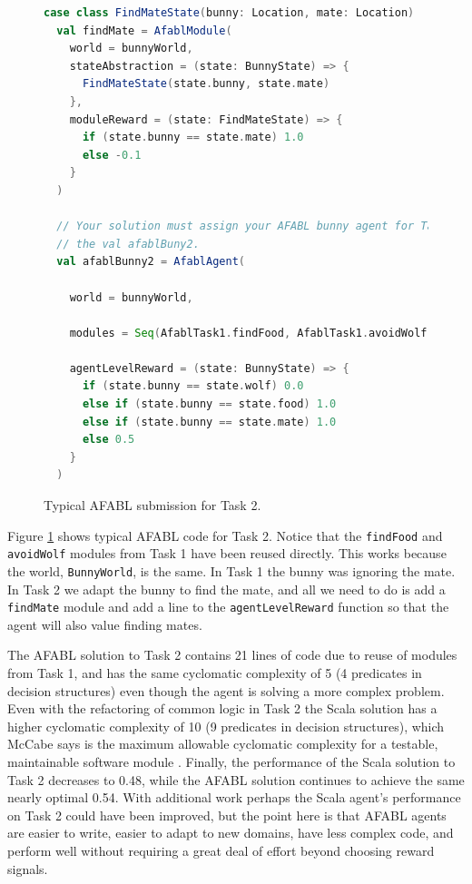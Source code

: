 \begin{figure}[!h]
\begin{center}

\begin{lstlisting}[language=Scala]
  case class FindMateState(bunny: Location, mate: Location)
  val findMate = AfablModule(
    world = bunnyWorld,
    stateAbstraction = (state: BunnyState) => {
      FindMateState(state.bunny, state.mate)
    },
    moduleReward = (state: FindMateState) => {
      if (state.bunny == state.mate) 1.0
      else -0.1
    }
  )

  // Your solution must assign your AFABL bunny agent for Task 2 to
  // the val afablBuny2.
  val afablBunny2 = AfablAgent(

    world = bunnyWorld,

    modules = Seq(AfablTask1.findFood, AfablTask1.avoidWolf, findMate),

    agentLevelReward = (state: BunnyState) => {
      if (state.bunny == state.wolf) 0.0
      else if (state.bunny == state.food) 1.0
      else if (state.bunny == state.mate) 1.0
      else 0.5
    }
  )
\end{lstlisting}

\caption{Typical AFABL submission for Task 2.}
\end{center}
\label{fig:afabl-task2-submission}
\end{figure}

Figure \ref{fig:afabl-task2-submission} shows typical AFABL code for Task 2. Notice that the {\tt findFood} and {\tt avoidWolf} modules from Task 1 have been reused directly. This works because the world, {\tt BunnyWorld}, is the same. In Task 1 the bunny was ignoring the mate. In Task 2 we adapt the bunny to find the mate, and all we need to do is add a {\tt findMate} module and add a line to the {\tt agentLevelReward} function so that the agent will also value finding mates.

The AFABL solution to Task 2 contains 21 lines of code due to reuse of modules from Task 1, and has the same cyclomatic complexity of 5 (4 predicates in decision structures) even though the agent is solving a more complex problem. Even with the refactoring of common logic in Task 2 the Scala solution has a higher cyclomatic complexity of 10 (9 predicates in decision structures), which McCabe says is the maximum allowable cyclomatic complexity for a testable, maintainable software module \cite{mccabe1976complexity}. Finally, the performance of the Scala solution to Task 2 decreases to 0.48, while the AFABL solution continues to achieve the same nearly optimal 0.54. With additional work perhaps the Scala agent's performance on Task 2 could have been improved, but the point here is that AFABL agents are easier to write, easier to adapt to new domains, have less complex code, and perform well without requiring a great deal of effort beyond choosing reward signals.

